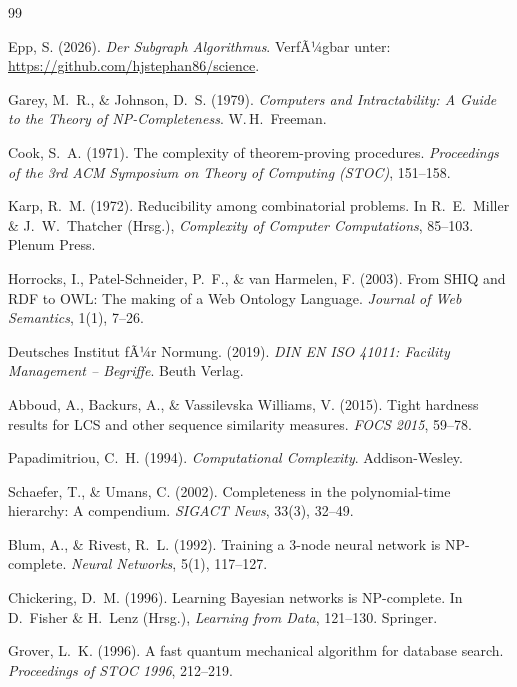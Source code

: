 ﻿\documentclass[a4paper,12pt]{article}
\theoremstyle{definition}
\begin{document}
\begin{thebibliography}{99}

    Epp, S. (2026).
    \textit{Der Subgraph Algorithmus}.
    VerfÃ¼gbar unter: \url{https://github.com/hjstephan86/science}.

    Garey, M.\ R., \& Johnson, D.\ S. (1979).
    \textit{Computers and Intractability: A Guide to the Theory of NP-Completeness}.
    W.\,H.\ Freeman.

    Cook, S.\ A. (1971).
    The complexity of theorem-proving procedures.
    \textit{Proceedings of the 3rd ACM Symposium on Theory of Computing (STOC)},
    151--158.

    Karp, R.\ M. (1972).
    Reducibility among combinatorial problems.
    In R.\ E.\ Miller \& J.\ W.\ Thatcher (Hrsg.),
    \textit{Complexity of Computer Computations}, 85--103.
    Plenum Press.

    Horrocks, I., Patel-Schneider, P.\ F., \& van Harmelen, F. (2003).
    From \textsc{SHIQ} and RDF to OWL: The making of a Web Ontology Language.
    \textit{Journal of Web Semantics}, 1(1), 7--26.

    Deutsches Institut fÃ¼r Normung. (2019).
    \textit{DIN EN ISO 41011: Facility Management -- Begriffe}.
    Beuth Verlag.

    Abboud, A., Backurs, A., \& Vassilevska Williams, V. (2015).
    Tight hardness results for LCS and other sequence similarity measures.
    \textit{FOCS 2015}, 59--78.

    Papadimitriou, C.\ H. (1994).
    \textit{Computational Complexity}.
    Addison-Wesley.

    Schaefer, T., \& Umans, C. (2002).
    Completeness in the polynomial-time hierarchy: A compendium.
    \textit{SIGACT News}, 33(3), 32--49.

    Blum, A., \& Rivest, R.\ L. (1992).
    Training a 3-node neural network is NP-complete.
    \textit{Neural Networks}, 5(1), 117--127.

    Chickering, D.\ M. (1996).
    Learning Bayesian networks is NP-complete.
    In D.\ Fisher \& H.\ Lenz (Hrsg.),
    \textit{Learning from Data}, 121--130.
    Springer.

    Grover, L.\ K. (1996).
    A fast quantum mechanical algorithm for database search.
    \textit{Proceedings of STOC 1996}, 212--219.


\end{thebibliography}
\end{document}
